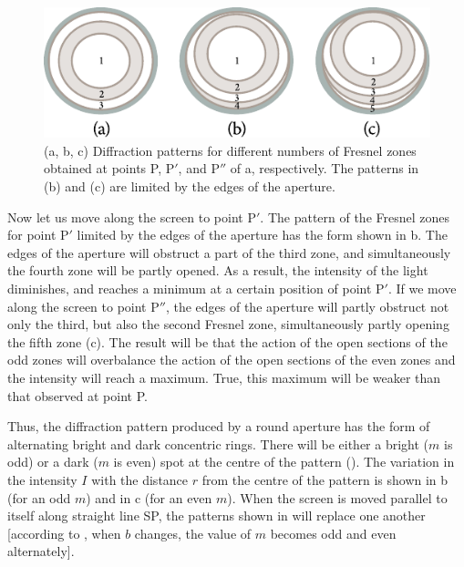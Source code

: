 \begin{figure}[!htb]
	\begin{center}
		\includegraphics[scale=1]{figures/ch_18/fig_18_11.pdf}
        \caption[]{(a, b, c) Diffraction patterns for different numbers of Fresnel zones obtained at points P, P$'$, and P$''$ of a, respectively. The patterns in (b) and (c) are limited by the edges of the aperture.}
		\label{fig:18_11}
	\end{center}
	\vspace{-0.8cm}
\end{figure}

Now let us move along the screen to point P$'$.
The pattern of the Fresnel zones for point P$'$ limited by the edges of the aperture has the form shown in b.
The edges of the aperture will obstruct a part of the third zone, and simultaneously the fourth zone will be partly opened.
As a result, the intensity of the light diminishes, and reaches a minimum at a certain position of point P$'$.
If we move along the screen to point P$''$, the edges of the aperture will partly obstruct not only the third, but also the second Fresnel zone, simultaneously partly opening the fifth zone (c).
The result will be that the action of the open sections of the odd zones will overbalance the action of the open sections of the even zones and the intensity will reach a maximum.
True, this maximum will be weaker than that observed at point P.

Thus, the diffraction pattern produced by a round aperture has the form of alternating bright and dark concentric rings.
There will be either a bright ($m$ is odd) or a dark ($m$ is even) spot at the centre of the pattern ().
The variation in the intensity $I$ with the distance $r$ from the centre of the pattern is shown in b (for an odd $m$) and in c (for an even $m$).
When the screen is moved parallel to itself along straight line SP, the patterns shown in  will replace one another [according to , when $b$ changes, the value of $m$ becomes odd and even alternately].

